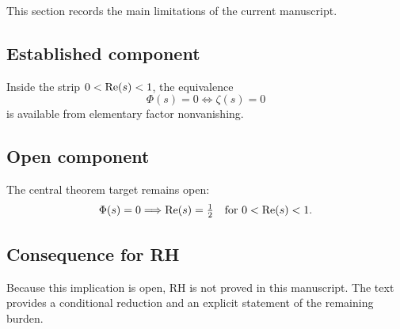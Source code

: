 This section records the main limitations of the current manuscript.

\subsection*{Established component}
Inside the strip $0<\operatorname{Re}(s)<1$, the equivalence
\[
\Phi(s)=0\iff\zeta(s)=0
\]
is available from elementary factor nonvanishing.

\subsection*{Open component}
The central theorem target remains open:
\[
\Phi(s)=0\Longrightarrow\operatorname{Re}(s)=\tfrac12
\quad\text{for }0<\operatorname{Re}(s)<1.
\]

\subsection*{Consequence for RH}
Because this implication is open, RH is not proved in this manuscript.
The text provides a conditional reduction and an explicit statement of the remaining burden.
